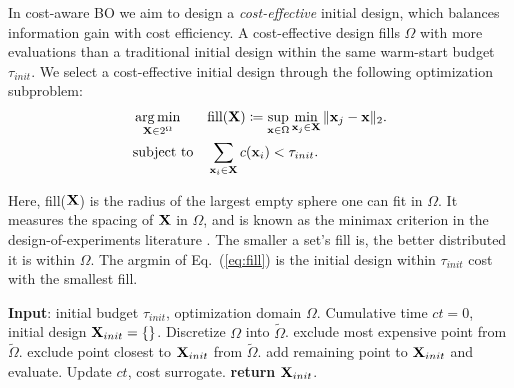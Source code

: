 \documentclass{article}
\begin{document}
In cost-aware BO we aim to design a \textit{cost-effective} initial design, which balances information gain with cost efficiency. A cost-effective design fills $\Omega$ with more evaluations than a traditional initial design within the same warm-start budget $\tau_{init}$. We select a cost-effective initial design through the following optimization subproblem:
\begin{equation}\label{eq:fill}
\begin{aligned}
& \operatorname*{arg\,min}_{{\mathbf X} \in 2^{ \Omega}} 
& & \text{fill}({\mathbf X}) \coloneqq  \sup_{{\mathbf x} \in \Omega} \min_{{\mathbf x}_j \in {\mathbf X}} \| {\mathbf x}_j - {\mathbf x} \|_2. \\
& \text{subject to}
& & \sum_{{\mathbf x}_i \in {\mathbf X}} c({\mathbf x}_i) < \tau_{init}.
\end{aligned}
\end{equation}

Here, fill(${\mathbf X}$) is the radius of the largest empty sphere one can fit in $\Omega$. It measures the spacing of ${\mathbf X}$ in $\Omega$, and is known as the minimax criterion in the design-of-experiments literature \cite{pronzato2012design}. The smaller a set's fill is, the better distributed it is within $\Omega$. The argmin of Eq.\ (\ref{eq:fill}) is the initial design within $\tau_{init}$ cost with the smallest fill. 

\begin{algorithm}[h]
   \caption{Cost-effective initial design}
   \label{alg:initial_design}
\begin{algorithmic}[1]
   \STATE \textbf{Input}: initial budget $\tau_{init}$, optimization domain $\Omega$.
   \STATE Cumulative time $ct = 0$, initial design ${\mathbf X}_{init} = \{\}$.
    \STATE Discretize $\Omega$ into $\tilde \Omega$.
        \STATE exclude most expensive point from $\tilde \Omega$.
        \STATE exclude point closest to ${\mathbf X}_{init}$ from $\tilde \Omega$.
        \ENDWHILE
        \STATE add remaining point to ${\mathbf X}_{init}$ and evaluate.
        \STATE Update $ct$, cost surrogate. 
    \ENDWHILE
    \STATE \textbf{return} ${\mathbf X}_{init}$.
\end{algorithmic}
\end{algorithm}
\end{document}
